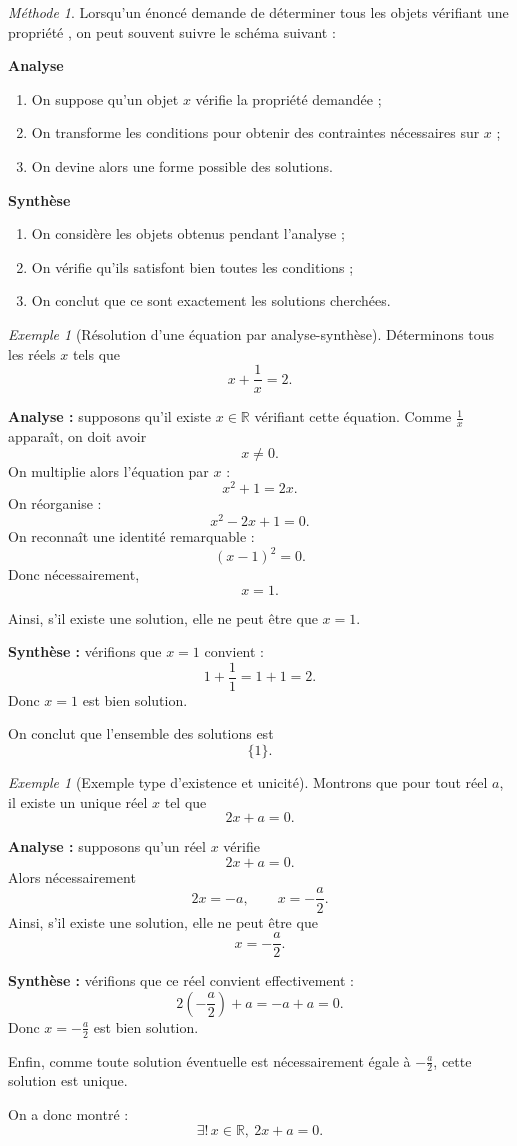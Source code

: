 \documentclass[11pt,a4paper]{article}
\theoremstyle{remark}
\newtheorem{exemple}[definition]{Exemple}
\newtheorem*{methode}{Méthode}
\newcommand{\R}{\mathbb{R}}
\begin{document}
\begin{methode}
Lorsqu’un énoncé demande de \og déterminer tous les objets vérifiant une propriété \fg, on peut souvent suivre le schéma suivant :

\textbf{Analyse}
\begin{enumerate}
    \item On suppose qu’un objet \(x\) vérifie la propriété demandée ;
    \item On transforme les conditions pour obtenir des contraintes nécessaires sur \(x\) ;
    \item On devine alors une forme possible des solutions.
\end{enumerate}

\textbf{Synthèse}
\begin{enumerate}
    \item On considère les objets obtenus pendant l’analyse ;
    \item On vérifie qu’ils satisfont bien toutes les conditions ;
    \item On conclut que ce sont exactement les solutions cherchées.
\end{enumerate}
\end{methode}

\begin{exemple}[Résolution d’une équation par analyse-synthèse]
Déterminons tous les réels \(x\) tels que
\[
x+\frac{1}{x} = 2.
\]

\textbf{Analyse :} supposons qu’il existe \(x\in\R\) vérifiant cette équation. Comme \(\frac{1}{x}\) apparaît, on doit avoir
\[
x\neq 0.
\]
On multiplie alors l’équation par \(x\) :
\[
x^2+1=2x.
\]
On réorganise :
\[
x^2-2x+1=0.
\]
On reconnaît une identité remarquable :
\[
(x-1)^2=0.
\]
Donc nécessairement,
\[
x=1.
\]

Ainsi, s’il existe une solution, elle ne peut être que \(x=1\).

\textbf{Synthèse :} vérifions que \(x=1\) convient :
\[
1+\frac{1}{1}=1+1=2.
\]
Donc \(x=1\) est bien solution.

On conclut que l’ensemble des solutions est
\[
\{1\}.
\]
\end{exemple}

\begin{exemple}[Exemple type d’existence et unicité]
Montrons que pour tout réel \(a\), il existe un unique réel \(x\) tel que
\[
2x+a=0.
\]

\textbf{Analyse :} supposons qu’un réel \(x\) vérifie
\[
2x+a=0.
\]
Alors nécessairement
\[
2x=-a,
\qquad
x=-\frac{a}{2}.
\]
Ainsi, s’il existe une solution, elle ne peut être que
\[
x=-\frac{a}{2}.
\]

\textbf{Synthèse :} vérifions que ce réel convient effectivement :
\[
2\left(-\frac{a}{2}\right)+a=-a+a=0.
\]
Donc \(x=-\frac{a}{2}\) est bien solution.

Enfin, comme toute solution éventuelle est nécessairement égale à \(-\frac{a}{2}\), cette solution est unique.

On a donc montré :
\[
\exists !\,x\in\R,\ 2x+a=0.
\]
\end{exemple}
\end{document}
